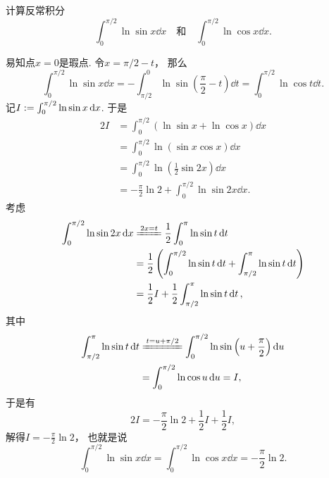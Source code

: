 \begin{example}
计算反常积分\begin{equation*}
	\int_0^{\pi/2} \ln\sin x \dd{x}
	\quad\text{和}\quad
	\int_0^{\pi/2} \ln\cos x \dd{x}.
\end{equation*}
\begin{solution}
易知点\(x=0\)是瑕点.
令\(x=\pi/2-t\)，
那么\begin{equation*}
	\int_0^{\pi/2} \ln\sin x \dd{x}
	= -\int_{\pi/2}^0 \ln\sin\left(\frac\pi2-t\right) \dd{t}
	= \int_0^{\pi/2} \ln\cos t \dd{t}.
\end{equation*}
记\(I := \int_0^{\pi/2} \ln\sin x \dd{x}\).
于是\begin{align*}
	2I &= \int_0^{\pi/2} (\ln\sin x + \ln\cos x) \dd{x} \\
	&= \int_0^{\pi/2} \ln(\sin x \cos x) \dd{x} \\
	&= \int_0^{\pi/2} \ln\left(\frac12 \sin2x\right) \dd{x} \\
	&= -\frac\pi2 \ln2 + \int_0^{\pi/2} \ln\sin2x \dd{x}.
\end{align*}
考虑\begin{align*}
	\int_0^{\pi/2} \ln\sin2x \dd{x}
	&\xlongequal{2x=t}
	\frac12 \int_0^\pi \ln\sin t \dd{t} \\
	&= \frac12 \left(
		\int_0^{\pi/2} \ln\sin t \dd{t}
		+ \int_{\pi/2}^\pi \ln\sin t \dd{t}
	\right) \\
	&= \frac12 I + \frac12 \int_{\pi/2}^\pi \ln\sin t \dd{t},
\end{align*}
其中\begin{align*}
	\int_{\pi/2}^\pi \ln\sin t \dd{t}
	&\xlongequal{t=u+\pi/2}
	\int_0^{\pi/2} \ln\sin\left(u+\frac\pi2\right) \dd{u} \\
	&= \int_0^{\pi/2} \ln\cos u \dd{u}
	= I,
\end{align*}
于是有\begin{equation*}
	2I = -\frac\pi2 \ln2 + \frac12 I + \frac12 I,
\end{equation*}
解得\(I = -\frac\pi2 \ln2\)，
也就是说\begin{equation}
	\int_0^{\pi/2} \ln\sin x \dd{x}
	= \int_0^{\pi/2} \ln\cos x \dd{x}
	= -\frac\pi2 \ln2.
\end{equation}
\end{solution}
\end{example}
